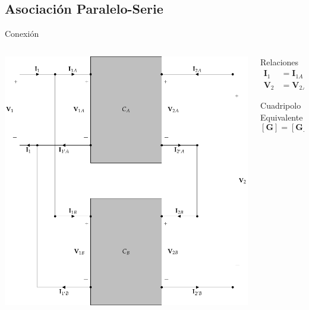 \documentclass[xcolor={usenames,svgnames,dvipsnames}]{beamer}
\begin{document}
\subsection{Asociación Paralelo-Serie}
\label{sec:org96cbb34}
\begin{frame}[label={sec:org9af3c80}]{Conexión}
\begin{columns}
\begin{column}{0.7\columnwidth}
\begin{center}
\includegraphics[height=0.75\textheight]{figs/paralelo-serie.pdf}
\end{center}
\end{column}
\begin{column}{0.35\columnwidth}
\begin{block}{Relaciones}
\begin{align*}
  \mathbf{I}_1 &= \mathbf{I}_{1A} + \mathbf{I}_{1B}\\
  \mathbf{V}_2 &= \mathbf{V}_{2A} + \mathbf{V}_{2B}
\end{align*}
\end{block}

\begin{block}{Cuadripolo Equivalente}
\[
  \boxed{[\mathbf{G}] = [\mathbf{G}_A] + [\mathbf{G}_B]}
\]
\end{block}
\end{column}
\end{columns}
\end{frame}
\end{document}
